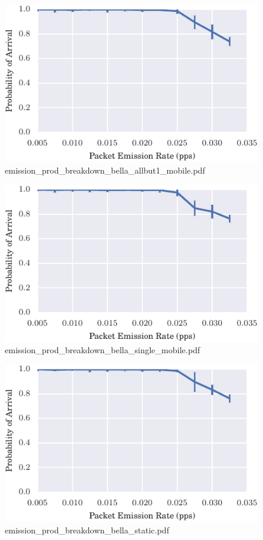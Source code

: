 \documentclass{article}
\begin{document}
\begin{figure}[h!]
\centering
\includegraphics[width=\linewidth]{emission_prod_breakdown_bella_allbut1_mobile.pdf}
\caption{emission\_prod\_breakdown\_bella\_allbut1\_mobile.pdf}
\end{figure}




\begin{figure}[h!]
\centering
\includegraphics[width=\linewidth]{emission_prod_breakdown_bella_single_mobile.pdf}
\caption{emission\_prod\_breakdown\_bella\_single\_mobile.pdf}
\end{figure}




\begin{figure}[h!]
\centering
\includegraphics[width=\linewidth]{emission_prod_breakdown_bella_static.pdf}
\caption{emission\_prod\_breakdown\_bella\_static.pdf}
\end{figure}
\end{document}
